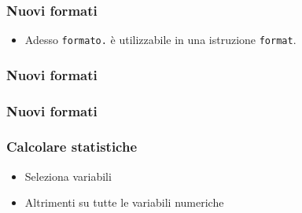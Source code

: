\documentclass[aspectratio=169]{beamer}
\begin{document}



\begin{frame}[containsverbatim]\frametitle{Nuovi formati}
  \begin{itemize}
  \item
    Adesso \texttt{formato.} {\`e} utilizzabile in una istruzione  \texttt{format}.
  \end{itemize}
\end{frame}


\begin{frame}[containsverbatim]\frametitle{Nuovi formati}
\end{frame}


\begin{frame}[containsverbatim]\frametitle{Nuovi formati}
\end{frame}




\begin{frame}[containsverbatim]\frametitle{Calcolare statistiche}
  \begin{itemize}
  \item
    Seleziona variabili
  \item
    Altrimenti su tutte le variabili numeriche
  \end{itemize}
\end{frame}
\end{document}
